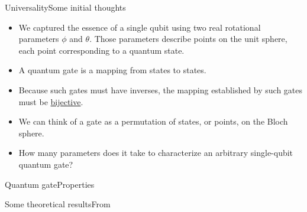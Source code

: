 
\begin{frame}{Universality}{Some initial thoughts}

\begin{itemize}[<+->]
    \item We captured the essence of a single qubit using two real rotational parameters $\phi$ and $\theta$.  Those parameters describe points on the unit sphere, each point corresponding to a quantum state.
    \item A quantum gate is a mapping from states to states.
    \item Because such gates must have inverses, the mapping established by such gates must be \href{https://en.wikipedia.org/wiki/Bijection}{bijective}.
    \item We can think of a gate as a permutation of states, or points, on the Bloch sphere.
    \item How many parameters does it take to characterize an arbitrary single-qubit quantum gate?
\end{itemize}

    
\end{frame}

\begin{frame}{Quantum gate}{Properties}

\BigSkip{}
    
\end{frame}



\begin{frame}{Some theoretical results}{From \Kaye{}}
\end{frame}

